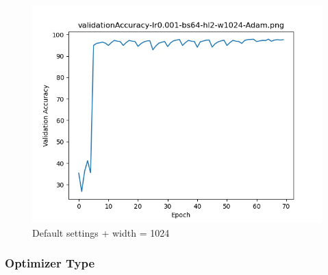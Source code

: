 \documentclass{article}[12pt]
\begin{document}
    \begin{figure}[H]
        \includegraphics[width=\linewidth]{testsResults/validationAccuracy/validationAccuracy-lr0.001-bs64-hl2-w1024-Adam.png}
        \caption{Default settings + width = 1024}
        \endminipage
    \end{figure}

\subsubsection{Optimizer Type}
\end{document}
